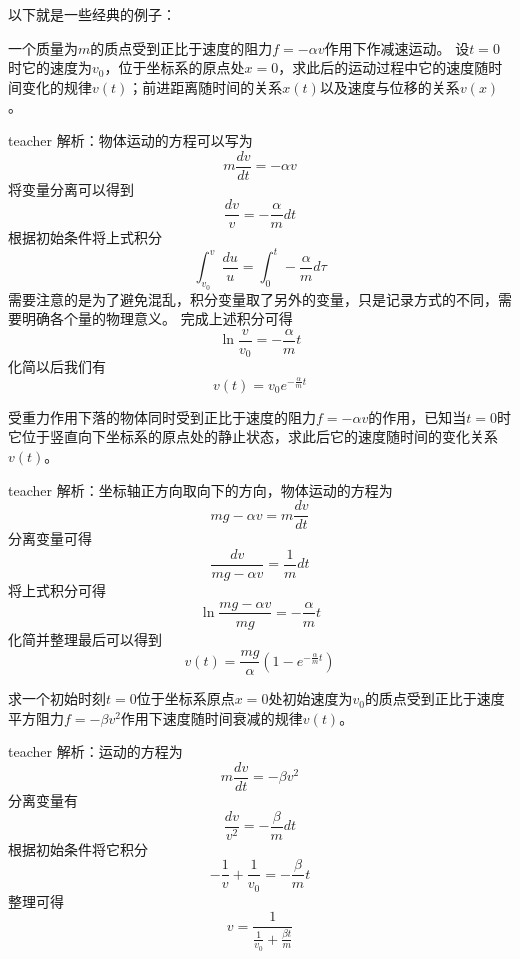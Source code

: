 以下就是一些经典的例子：

\begin{example}
一个质量为$m$的质点受到正比于速度的阻力$f=-\alpha v$作用下作减速运动。
设$t=0$时它的速度为$v_0$，位于坐标系的原点处$x=0$，求此后的运动过程中它的速度随时间变化的规律$v(t)$；前进距离随时间的关系$x(t)$以及速度与位移的关系$v(x)$。
\begin{taggedblock}{teacher}
\newline
解析：物体运动的方程可以写为
\[
m\frac{dv}{dt}=-\alpha v
\]
将变量分离可以得到
\[
\frac{dv}{v}=-\frac{\alpha}{m}dt
\]
根据初始条件将上式积分
\[
\int_{v_0}^v\frac{du}{u}=\int_0^t -\frac{\alpha}{m}d\tau
\]
需要注意的是为了避免混乱，积分变量取了另外的变量，只是记录方式的不同，需要明确各个量的物理意义。
完成上述积分可得
\[
\ln\frac{v}{v_0}=-\frac{\alpha}{m}t
\]
化简以后我们有
\[
v(t)=v_0e^{-\frac{\alpha}{m}t}
\]
\end{taggedblock}
\end{example}

\begin{example}
受重力作用下落的物体同时受到正比于速度的阻力$f=-\alpha v$的作用，已知当$t=0$时它位于竖直向下坐标系的原点处的静止状态，求此后它的速度随时间的变化关系$v(t)$。
\begin{taggedblock}{teacher}
\newline
解析：坐标轴正方向取向下的方向，物体运动的方程为
\[ mg-\alpha v = m\frac{dv}{dt}\]
分离变量可得
\[\frac{dv}{mg-\alpha v} = \frac{1}{m}dt  \]
将上式积分可得
\[\ln\frac{mg-\alpha v}{mg} =-\frac{\alpha}{m}t \]
化简并整理最后可以得到
\[
v(t)=\frac{mg}{\alpha}(1-e^{-\frac{\alpha}{m}t})
\]
\end{taggedblock}
\end{example}

\begin{example}
求一个初始时刻$t=0$位于坐标系原点$x=0$处初始速度为$v_0$的质点受到正比于速度平方阻力$f=-\beta v^2$作用下速度随时间衰减的规律$v(t)$。
\begin{taggedblock}{teacher}
\newline
解析：运动的方程为
\[m\frac{dv}{dt}=-\beta v^2\]
分离变量有
\[\frac{dv}{v^2}=-\frac{\beta}{m}dt\]
根据初始条件将它积分
\[
-\frac{1}{v}+\frac{1}{v_0} = -\frac{\beta}{m}t
\]
整理可得
\[
v=\frac{1}{\frac{1}{v_0}+\frac{\beta t}{m}}
\]
\end{taggedblock}
\end{example}

